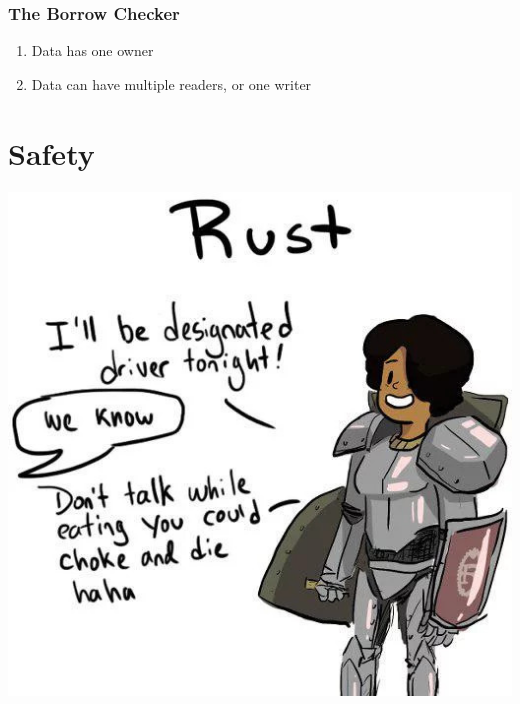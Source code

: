 \documentclass{beamer}
\begin{document}
\begin{frame}
    \frametitle{The Borrow Checker}
    \begin{enumerate}
        \item Data has one owner
        \item Data can have multiple readers, or one writer
    \end{enumerate}
\end{frame}

\section{Safety}
\begin{frame}
    \includegraphics[scale=0.4]{images/rust-taxi.jpg}
    \centering
\end{frame}
\end{document}
